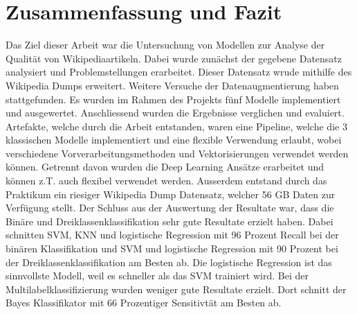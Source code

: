 \section{Zusammenfassung und Fazit}
\label{ZusammenfassungUndFazit}
Das Ziel dieser Arbeit war die Untersuchung von Modellen zur Analyse der Qualität von Wikipediaartikeln. Dabei wurde zunächst der gegebene Datensatz analysiert und Problemstellungen erarbeitet. Dieser Datensatz wrude mithilfe des Wikipedia Dumps erweitert. Weitere Versuche der Datenaugmentierung haben stattgefunden. Es wurden im Rahmen des Projekts fünf Modelle implementiert und ausgewertet. Anschliessend wurden die Ergebnisse verglichen und evaluiert. Artefakte, welche durch die Arbeit entstanden, waren eine Pipeline, welche die 3 klassischen Modelle implementiert und eine flexible Verwendung erlaubt, wobei verschiedene Vorverarbeitungsmethoden und Vektorisierungen verwendet werden können. Getrennt davon wurden die Deep Learning Ansätze erarbeitet und können z.T. auch flexibel verwendet werden. Ausserdem entstand durch das Praktikum ein riesiger Wikipedia Dump Datensatz, welcher 56 GB Daten zur Verfügung stellt.
Der Schluss aus der Auswertung der Resultate war, dass die Binäre und Dreiklassenklassifikation sehr gute Resultate erzielt haben. Dabei schnitten SVM, KNN und logistische Regression mit 96 Prozent Recall bei der binären Klassifikation und SVM und logistische Regression mit 90 Prozent bei der Dreiklassenklassifikation am Besten ab. Die logistische Regression ist das sinnvollste Modell, weil es schneller als das SVM trainiert wird. Bei der Multilabelklassifizierung wurden weniger gute Resultate erzielt. Dort schnitt der Bayes Klassifikator mit 66 Prozentiger Sensitivtät am Besten ab.
